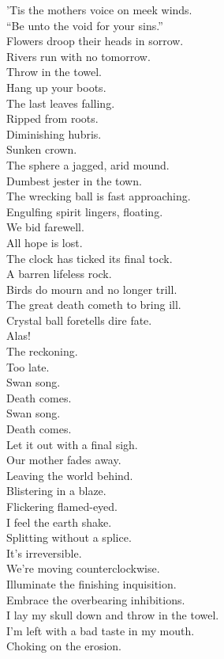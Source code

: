 'Tis the mothers voice on meek winds. \\
``Be unto the void for your sins.'' \\
Flowers droop their heads in sorrow. \\
Rivers run with no tomorrow. \\

Throw in the towel. \\
Hang up your boots. \\
The last leaves falling. \\
Ripped from roots. \\
Diminishing hubris. \\
Sunken crown. \\
The sphere a jagged, arid mound. \\
Dumbest jester in the town. \\
The wrecking ball is fast approaching. \\
Engulfing spirit lingers, floating. \\
We bid farewell. \\
All hope is lost. \\
The clock has ticked its final tock. \\
A barren lifeless rock. \\

Birds do mourn and no longer trill. \\
The great death cometh to bring ill. \\
Crystal ball foretells dire fate. \\
Alas! \\
The reckoning. \\
Too late. \\

Swan song. \\
Death comes. \\
Swan song. \\
Death comes. \\

Let it out with a final sigh. \\
Our mother fades away. \\
Leaving the world behind. \\
Blistering in a blaze. \\
Flickering flamed-eyed. \\
I feel the earth shake. \\
Splitting without a splice. \\
It's irreversible. \\
We're moving counterclockwise. \\
Illuminate the finishing inquisition. \\
Embrace the overbearing inhibitions. \\
I lay my skull down and throw in the towel. \\
I'm left with a bad taste in my mouth. \\
Choking on the  erosion. \\

